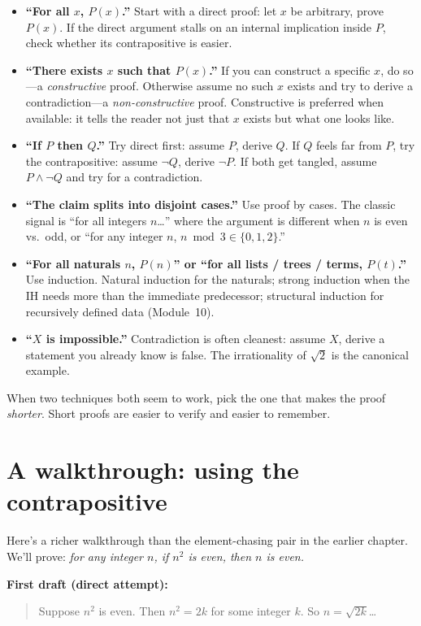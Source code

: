 \documentclass[11pt]{article}
\begin{document}
\begin{itemize}
  \item \textbf{``For all $x$, $P(x)$.''} Start with a direct proof: let $x$ be arbitrary, prove $P(x)$. If the direct argument stalls on an internal implication inside $P$, check whether its contrapositive is easier.
  \item \textbf{``There exists $x$ such that $P(x)$.''} If you can construct a specific $x$, do so---a \emph{constructive} proof. Otherwise assume no such $x$ exists and try to derive a contradiction---a \emph{non-constructive} proof. Constructive is preferred when available: it tells the reader not just that $x$ exists but what one looks like.
  \item \textbf{``If $P$ then $Q$.''} Try direct first: assume $P$, derive $Q$. If $Q$ feels far from $P$, try the contrapositive: assume $\lnot Q$, derive $\lnot P$. If both get tangled, assume $P \wedge \lnot Q$ and try for a contradiction.
  \item \textbf{``The claim splits into disjoint cases.''} Use proof by cases. The classic signal is ``for all integers $n$\ldots'' where the argument is different when $n$ is even vs.\ odd, or ``for any integer $n$, $n \bmod 3 \in \{0, 1, 2\}$.''
  \item \textbf{``For all naturals $n$, $P(n)$'' or ``for all lists / trees / terms, $P(t)$.''} Use induction. Natural induction for the naturals; strong induction when the IH needs more than the immediate predecessor; structural induction for recursively defined data (Module~10).
  \item \textbf{``$X$ is impossible.''} Contradiction is often cleanest: assume $X$, derive a statement you already know is false. The irrationality of $\sqrt{2}$ is the canonical example.
\end{itemize}

When two techniques both seem to work, pick the one that makes the proof \emph{shorter}. Short proofs are easier to verify and easier to remember.

\section{A walkthrough: using the contrapositive}

Here's a richer walkthrough than the element-chasing pair in the earlier chapter. We'll prove: \emph{for any integer $n$, if $n^2$ is even, then $n$ is even.}

\medskip
\noindent\textbf{First draft (direct attempt):}
\begin{quote}
Suppose $n^2$ is even. Then $n^2 = 2k$ for some integer $k$. So $n = \sqrt{2k}$\ldots
\end{quote}
\end{document}
